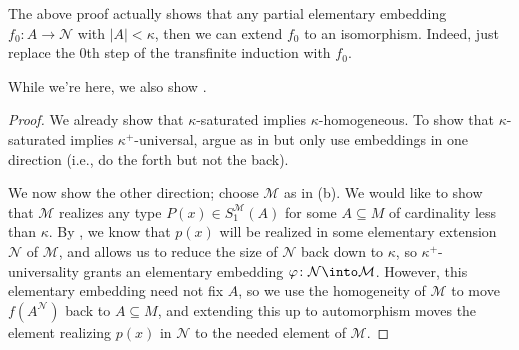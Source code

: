 \documentclass[../notes.tex]{subfiles}
\begin{document}
\begin{remark}
	The above proof actually shows that any partial elementary embedding $f_0\colon A\to\mathcal N$ with $\left|A\right|<\kappa$, then we can extend $f_0$ to an isomorphism. Indeed, just replace the $0$th step of the transfinite induction with $f_0$.
\end{remark}
While we're here, we also show .
\satisunivhomo*
\begin{proof}
	We already show that $\kappa$-saturated implies $\kappa$-homogeneous. To show that $\kappa$-saturated implies $\kappa^+$-universal, argue as in  but only use embeddings in one direction (i.e., do the forth but not the back).

	We now show the other direction; choose $\mathcal M$ as in (b). We would like to show that $\mathcal M$ realizes any type $P(x)\in S_1^\mathcal M(A)$ for some $A\subseteq M$ of cardinality less than $\kappa$. By , we know that $p(x)$ will be realized in some elementary extension $\mathcal N$ of $\mathcal M$, and  allows us to reduce the size of $\mathcal N$ back down to $\kappa$, so $\kappa^+$-universality grants an elementary embedding $\varphi\colon\mathcal N\into\mathcal M$. However, this elementary embedding need not fix $A$, so we use the homogeneity of $\mathcal M$ to move $f(A^{\mathcal N})$ back to $A\subseteq M$, and extending this up to automorphism moves the element realizing $p(x)$ in $\mathcal N$ to the needed element of $\mathcal M$.
\end{proof}
\end{document}
